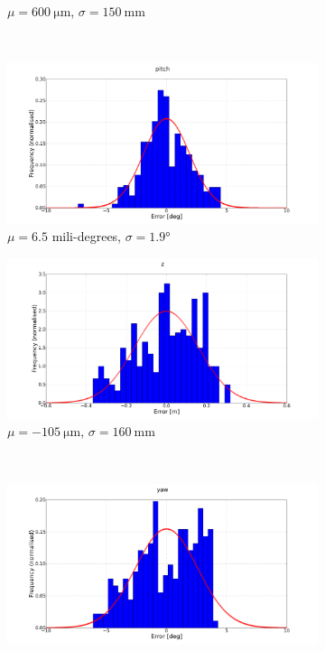 \begin{figure}
\begin{subfigure}{0.48\textwidth}
    \caption{$\mu = \SI{600}{\micro \m}$, $\sigma = \SI{150}{\mm}$}
  \end{subfigure}
  ~
  \begin{subfigure}{0.48\textwidth}
    \includegraphics[width=\textwidth, clip, trim = 100 20 100 20]{figures/chapter5/err_pitch}
    \caption{$\mu = 6.5$ mili-degrees, $\sigma = \ang{1.9}$}
  \end{subfigure}
  \begin{subfigure}{0.48\textwidth}
    \includegraphics[width=\textwidth, clip, trim = 100 20 100 20]{figures/chapter5/err_z}
    \caption{$\mu = \SI{-105}{\micro \m}$, $\sigma = \SI{160}{\mm}$}
  \end{subfigure}
  ~
  \begin{subfigure}{0.48\textwidth}
    \includegraphics[width=\textwidth, clip, trim = 100 20 100 20]{figures/chapter5/err_yaw}

\end{subfigure}
\end{figure}
